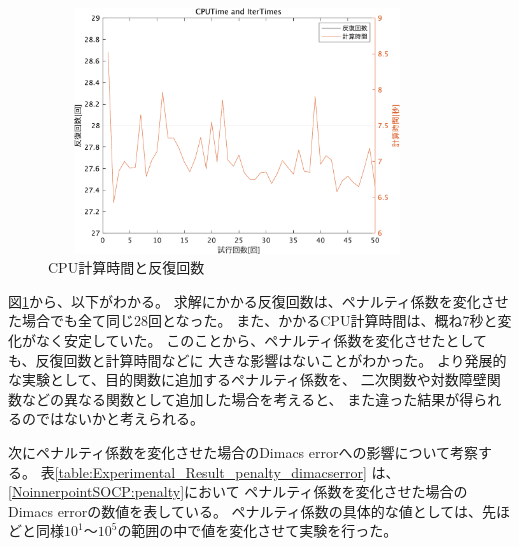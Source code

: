 \documentclass[11pt,a4paper,dvipdfmx,titlepage,uplatex]{jsarticle}
\theoremstyle{mystyle}
\newcommand{\red}[1]{\begin{color}{red}#1\end{color}}
\newcommand{\0}{\mathbf{0}}
\begin{document}
\begin{figure}[tp]
  \begin{center}
    \includegraphics[width=100mm,height = 65mm]{CPUtimePlots5.pdf}
    \caption{CPU計算時間と反復回数 \label{figure:CPUtime}}
  \end{center}
\end{figure}

図\ref{figure:CPUtime}から、以下がわかる。
求解にかかる反復回数は、ペナルティ係数を変化させた場合でも全て同じ28回となった。
また、かかるCPU計算時間は、概ね7秒と変化がなく安定していた。
このことから、ペナルティ係数を変化させたとしても、反復回数と計算時間などに
大きな影響はないことがわかった。
より発展的な実験として、目的関数に追加するペナルティ係数を、
二次関数や対数障壁関数などの異なる関数として追加した場合を考えると、
また違った結果が得られるのではないかと考えられる。

次にペナルティ係数を変化させた場合のDimacs errorへの影響について考察する。
表\ref{table:Experimental_Result_penalty_dimacserror}
は、\eqref{NoinnerpointSOCP:penalty}において
ペナルティ係数を変化させた場合のDimacs errorの数値を表している。
ペナルティ係数の具体的な値としては、先ほどと同様$10^1$〜$10^5$の範囲の中で値を変化させて実験を行った。
\end{document}
